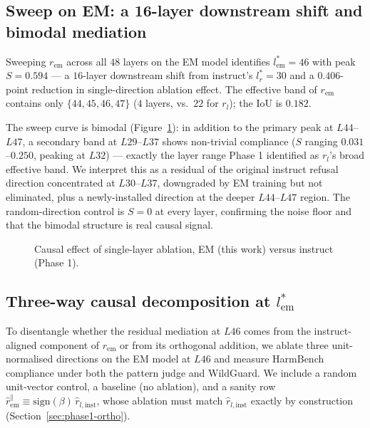 \subsection{Sweep on EM: a 16-layer downstream shift and bimodal mediation}
\label{sec:p2-sweep}

Sweeping $r_{\text{em}}$ across all $48$ layers on the EM model
identifies $l^*_{\text{em}} = 46$ with peak $S = 0.594$ --- a
$16$-layer downstream shift from instruct's $l^*_r = 30$ and a
$0.406$-point reduction in single-direction ablation effect.
The effective band of $r_{\text{em}}$ contains only
$\{44, 45, 46, 47\}$ ($4$ layers, vs.\ $22$ for $r_l$); the IoU is
$0.182$.

The sweep curve is bimodal (Figure~\ref{fig:p2-sweep}): in addition
to the primary peak at $L44$--$L47$, a secondary band at $L29$--$L37$
shows non-trivial compliance ($S$ ranging $0.031$--$0.250$, peaking
at $L32$) --- exactly the layer range Phase 1 identified as $r_l$'s
broad effective band. We interpret this as a residual of the
original instruct refusal direction concentrated at $L30$--$L37$,
downgraded by EM training but not eliminated, plus a
newly-installed direction at the deeper $L44$--$L47$ region. The
random-direction control is $S = 0$ at every layer, confirming the
noise floor and that the bimodal structure is real causal signal.

\begin{figure}[t]
\centering
{}
\caption{Causal effect of single-layer ablation, EM (this work)
versus instruct (Phase 1).}
\label{fig:p2-sweep}
\end{figure}

\subsection{Three-way causal decomposition at $l^*_{\text{em}}$}
\label{sec:p2-3way}

To disentangle whether the residual mediation at $L46$ comes from
the instruct-aligned component of $r_{\text{em}}$ or from its
orthogonal addition, we ablate three unit-normalised directions on
the EM model at $L46$ and measure HarmBench compliance under both
the pattern judge and WildGuard. We include a random unit-vector
control, a baseline (no ablation), and a sanity row
$\hat{r}_{\text{em}}^{\parallel}
\equiv \mathrm{sign}(\beta)\,\hat{r}_{l,\text{inst}}$, whose ablation
must match $\hat{r}_{l,\text{inst}}$ exactly by construction
(Section~\ref{sec:phase1-ortho}).

